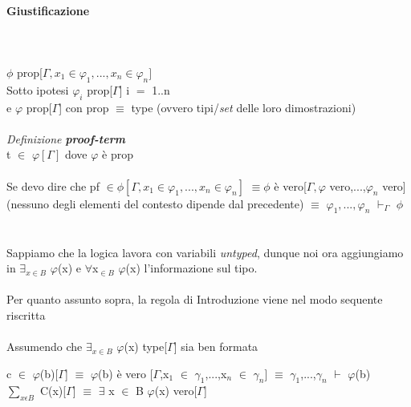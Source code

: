 \paragraph{Giustificazione}\mbox{}\\\\
\noindent
$\phi$ prop[$\Gamma,x_1 \in \varphi_1,...,x_n \in \varphi_n]$\\
\noindent Sotto ipotesi $\varphi_i$ prop[$\Gamma$] \quad i $=$ 1..n\\
\noindent e $\varphi$ prop[$\Gamma$] con prop $\equiv$ type (ovvero tipi/\textit{set} delle loro dimostrazioni)\\\\
\noindent
\textit{Definizione} \textbf{\textit{proof-term}}\\ t $\in$ $\varphi[\Gamma]$ dove $\varphi$ \`e prop\\\\
\noindent 
Se devo dire che
pf $\in \phi[\Gamma,x_1 \in \varphi_1,...,x_n \in \varphi_n]$
$\equiv \phi$ \`e vero[$\Gamma, \varphi$ vero,...,$\varphi_n$ vero] (nessuno degli elementi del contesto dipende dal precedente)
$\equiv$ $\varphi_1,...,\varphi_n$ $\vdash_\Gamma$ $\phi$
\\\\\\
\noindent
Sappiamo che la logica lavora con variabili \textit{untyped}, dunque noi ora aggiungiamo in  $\exists_{ x\in B}$ $\varphi$(x) e $\forall$x$_{\in B}$ $\varphi$(x) l'informazione sul tipo.
\\\\
\noindent
Per quanto assunto sopra, la regola di Introduzione viene nel modo sequente riscritta\\\\
\noindent
Assumendo che $\exists_{x \in B}$ $\varphi$(x) type[$\Gamma$] sia ben formata
\begin{prooftree}
\end{prooftree}
\noindent
c $\in$ $\varphi$(b)[$\Gamma$] $\equiv$ $\varphi$(b) \`e vero [$\Gamma$,x$_1$ $\in$ $\gamma_1$,...,x$_n$ $\in$ $\gamma_n$] $\equiv$ $\gamma_1$,...,$\gamma_n$ $\vdash$ $\varphi$(b)\\
$\sum\limits_{x \epsilon B}$ C(x)[$\Gamma$] $\equiv$ $\exists$ x $\in$ B $\varphi$(x) vero[$\Gamma$]\\\\
